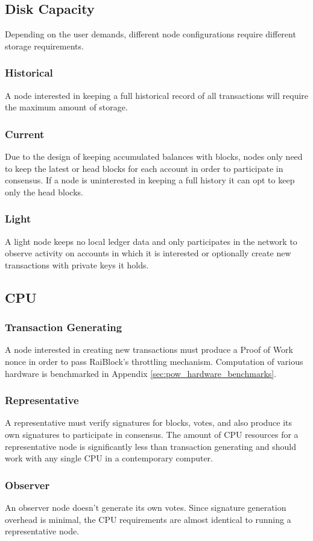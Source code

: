 \subsection{Disk Capacity}
Depending on the user demands, different node configurations require different storage requirements.

\subsubsection{Historical}
A node interested in keeping a full historical record of all transactions will require the maximum amount of storage.

\subsubsection{Current}
Due to the design of keeping accumulated balances with blocks, nodes only need to keep the latest or head blocks for each account in order to participate in consensus. If a node is uninterested in keeping a full history it can opt to keep only the head blocks.

\subsubsection{Light}
A light node keeps no local ledger data and only participates in the network to observe activity on accounts in which it is interested or optionally create new transactions with private keys it holds.

\subsection{CPU}
\subsubsection{Transaction Generating}
A node interested in creating new transactions must produce a Proof of Work nonce in order to pass RaiBlock's throttling mechanism. Computation of various hardware is benchmarked in Appendix \ref{sec:pow_hardware_benchmarks}.

\subsubsection{Representative}
A representative must verify signatures for blocks, votes, and also produce its own signatures to participate in consensus. The amount of CPU resources for a representative node is significantly less than transaction generating and should work with any single CPU in a contemporary computer.

\subsubsection{Observer}
An observer node doesn't generate its own votes. Since signature generation overhead is minimal, the CPU requirements are almost identical to running a representative node.